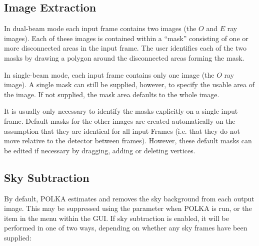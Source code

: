 \documentclass[11pt,nolof]{starlink}
\providecommand{\mylabel}[1] {\xlabel{#1}\label{#1}}
\begin{document}
\subsection{\mylabel{POLKA_EXTRACT}Image Extraction}
In dual-beam mode each input frame contains two images (the $O$ and $E$
ray images). Each of these images is contained within a ``mask''
consisting of one or more disconnected areas in the input frame. The user
identifies each of the two masks by drawing a polygon around the
disconnected areas forming the mask.

In single-beam mode, each input frame contains only one image (the $O$
ray image). A single mask can still be supplied, however, to specify the
usable area of the image. If not supplied, the mask area defaults to the
whole image.

It is usually only necessary to identify the masks explicitly on a single
input frame. Default masks for the other images are created automatically
on the assumption that they are identical for all input Frames (i.e. that
they do not move relative to the detector between frames). However, these
default masks can be edited if necessary by dragging, adding or deleting
vertices.

\subsection {\mylabel{POLKA_SKYSUB}Sky Subtraction}
By default, POLKA estimates and removes the sky background from each
output image. This may be suppressed using the
 parameter when POLKA is run, or the
 item in the  menu within the GUI. If sky subtraction is
enabled, it will be performed in one of two ways, depending on whether
any sky frames have been supplied:
\end{document}
